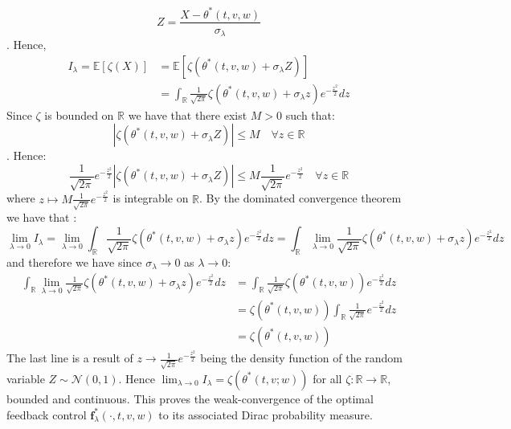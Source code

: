 \documentclass[oneside, a4paper, onecolumn, 11pt]{article}
\begin{document}
$$Z = \frac{X-\theta^*(t,v,w)}{\sigma_\lambda}$$.
Hence, 
\begin{align*}
I_\lambda = \mathbb{E}[\zeta(X)] &= \mathbb{E}[\zeta(\theta^*(t,v,w) + \sigma_\lambda Z)]\\
&= \int_{\mathbb{R}} \frac{1}{\sqrt{2\pi}}\zeta(\theta^*(t,v,w)+ \sigma_\lambda z)e^{-\frac{z^2}{2}} dz 
\end{align*}
Since $\zeta$ is bounded on $\mathbb{R}$ we have that there exist $M > 0 $ such that: 
\begin{equation}
    | \zeta(\theta^*(t,v,w) + \sigma_\lambda Z)| \leq M \quad \forall z \in \mathbb{R}
\end{equation}. 
Hence: 
\begin{equation}
  \frac{1}{\sqrt{2\pi}} e^{-\frac{z^2}{2}}  | \zeta(\theta^*(t,v,w) + \sigma_\lambda Z)| \leq M \frac{1}{\sqrt{2\pi}} e^{-\frac{z^2}{2}} \quad \forall z \in \mathbb{R}
\end{equation}
where $z \mapsto M \frac{1}{\sqrt{2\pi}} e^{-\frac{z^2}{2}} $ is integrable on $\mathbb{R}$. 
By the dominated convergence theorem we have that : 
\begin{equation}
    \lim_{\lambda \to 0} I_\lambda =\lim_{\lambda \to 0}  \int_{\mathbb{R}} \frac{1}{\sqrt{2\pi}}\zeta(\theta^*(t,v,w)+ \sigma_\lambda z)e^{-\frac{z^2}{2}} dz  = \int_{\mathbb{R}} \lim_{\lambda \to 0}  \frac{1}{\sqrt{2\pi}}\zeta(\theta^*(t,v,w)+ \sigma_\lambda z)e^{-\frac{z^2}{2}} dz
\end{equation}
and therefore we have since $\sigma_\lambda \to 0$ as $\lambda \to 0$:
\begin{align*}
    \int_{\mathbb{R}} \lim_{\lambda \to 0}  \frac{1}{\sqrt{2\pi}}\zeta(\theta^*(t,v,w)+ \sigma_\lambda z)e^{-\frac{z^2}{2}} dz &=    \int_{\mathbb{R}}  \frac{1}{\sqrt{2\pi}}\zeta(\theta^*(t,v,w))e^{-\frac{z^2}{2}} dz \\
    &=  \zeta(\theta^*(t,v,w)) \int_{\mathbb{R}}  \frac{1}{\sqrt{2\pi}}e^{-\frac{z^2}{2}} dz \\
    &= \zeta(\theta^*(t,v,w))
\end{align*}
The last line is a result of $z\to \frac{1}{\sqrt{2\pi}}e^{-\frac{z^2}{2}}$ being the density function of the random variable $Z \sim \mathcal{N}(0,1)$. Hence $\lim_{\lambda \to 0} I_\lambda =  \zeta(\theta^*(t,v;w))$ for all $\zeta : \mathbb{R} \to \mathbb{R}$, bounded and continuous. This proves the weak-convergence of the optimal feedback control $\boldsymbol{f}_\lambda^*(\cdot,t,v,w)$ to its associated Dirac probability measure. 
\end{document}
